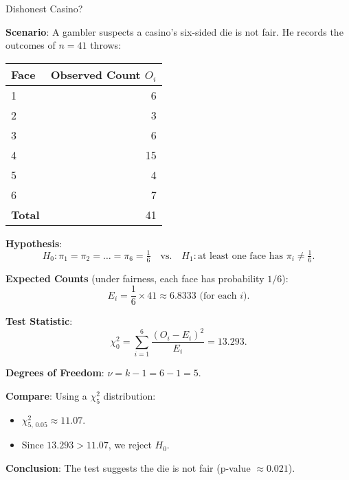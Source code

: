 \documentclass[10pt]{extarticle}
\begin{document}
\begin{examplebox}{Dishonest Casino?}{}

    \textbf{Scenario}: A gambler suspects a casino's six-sided die is not fair. He records the outcomes of $n=41$ throws:

    \begin{center}
        \begin{tabular}{lr}
            \toprule
            Face           & Observed Count $O_i$ \\
            \midrule
            1              & 6                    \\
            2              & 3                    \\
            3              & 6                    \\
            4              & 15                   \\
            5              & 4                    \\
            6              & 7                    \\
            \midrule
            \textbf{Total} & 41                   \\
            \bottomrule
        \end{tabular}
    \end{center}

    \textbf{Hypothesis}:
    \[
        H_0:
        \pi_1 = \pi_2 = \dots = \pi_6 = \tfrac{1}{6}
        \quad
        \text{vs.}
        \quad
        H_1:
        \text{at least one face has }\pi_i \neq \tfrac{1}{6}.
    \]

    \textbf{Expected Counts} (under fairness, each face has probability $1/6$):
    \[
        E_i = \frac{1}{6} \times 41 \approx 6.8333 \text{ (for each }i).
    \]

    \textbf{Test Statistic}:
    \[
        \chi^2_0
        = \sum_{i=1}^{6} \frac{(O_i - E_i)^2}{E_i}
        = 13.293.
    \]

    \textbf{Degrees of Freedom}: $\nu = k-1 = 6 - 1 = 5$.

    \textbf{Compare}: Using a $\chi^2_5$ distribution:
    \begin{itemize}
        \item $\chi^2_{5,\,0.05} \approx 11.07$.
        \item Since $13.293 > 11.07$, we reject $H_0$.
    \end{itemize}

    \textbf{Conclusion}: The test suggests the die is not fair (p-value $\approx 0.021$).
\end{examplebox}
\end{document}
